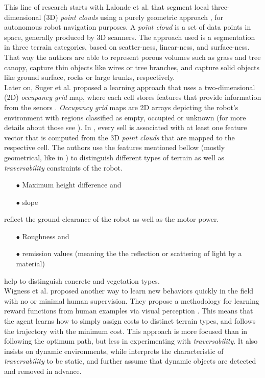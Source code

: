 \documentclass[12pt,a4paper]{report}
\newcommand{\term}{\textit}
\newcommand{\acronym}{\MakeUppercase}
\begin{document}
	This line of research starts with Lalonde et al. that segment local three-
	dimensional (\acronym{3d}) \term{point clouds} using a purely geometric 
	approach \cite{Lalonde}, for autonomous robot navigation purposes. A 
	\term{point cloud} is a set of data points in space, generally produced by 
	\acronym{3d} scanners. The approach used is a segmentation in three terrain 
	categories, based on scatter-ness, linear-ness, and surface-ness. That way 
	the authors are able to represent porous volumes such as grass and tree canopy, 
	capture thin objects like wires or tree branches, and capture solid objects 
	like ground surface, rocks or large trunks, respectively.
	\\	
	
	Later on, Suger et al. proposed a learning approach that uses a two-dimensional 
	(\acronym{2d}) \term{occupancy grid} map, where each cell stores features 
	that provide information from the senors \cite{Suger}. \term{Occupancy grid} 
	maps are \acronym{2d} arrays depicting the robot’s environment with regions 
	classified as empty, occupied or unknown (for more details about those see 
	\cite{Moravec}). In \cite{Suger}, every sell is associated with at least one 
	feature vector that is computed from the \acronym{3d} \term{point clouds} that 
	are mapped to the respective cell. The authors use the features mentioned 
	bellow (mostly geometrical, like in \cite{Lalonde}) to distinguish different 
	types of terrain as well as \term{traversability} constraints of the robot. 
	\begin{enumerate}
		\item[$\bullet$] Maximum height difference and
		\item[$\bullet$] slope 
	\end{enumerate}
	reflect the ground-clearance of the robot as well as the motor power.
	\begin{enumerate}
		\item[$\bullet$] Roughness and
		\item[$\bullet$] remission values (meaning the the reflection or scattering 
		of light by a material) 
	\end{enumerate}
	help to distinguish concrete and vegetation types.
	\\
	
	Wigness et al. proposed another way to learn new behaviors quickly in the 
	field with no or minimal human supervision. They propose a methodology for 
	learning reward functions from human examples via visual perception 
	\cite{Wigness}. This means that the agent learns how to simply assign costs 
	to distinct terrain types, and follows the trajectory with the minimum cost. 
	This approach is more focused than \cite{Suger} in following the optimum path, 
	but less in experimenting with \term{traversability}. It also insists on 
	dynamic environments, while \cite{Suger} interprets the characteristic of 
	\term{traversability} to be static, and further assume that dynamic objects 
	are detected and removed in advance.
	\\
	
\end{document}
